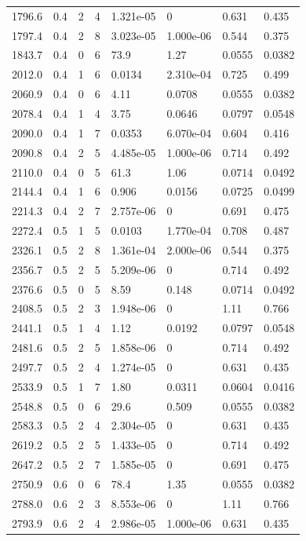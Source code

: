 \documentclass[preview]{standalone}
\begin{document}
{{{\begin{tabular}{L{1.2cm}C{1.2cm} C{0.3cm}C{0.5cm} C{1.4cm}C{1.4cm} C{1.4cm}C{1.4cm}}
  1796.6  &   0.4  & 2     &  4 &  1.321e-05  & 0  & 0.631 &  0.435   \\ 
  1797.4  &   0.4  & 2     &  8 &  3.023e-05  & 1.000e-06  & 0.544 &  0.375   \\ 
  1843.7  &   0.4  & 0     &  6 &  73.9  & 1.27  & 0.0555 &  0.0382   \\ 
  2012.0  &   0.4  & 1     &  6 &  0.0134  & 2.310e-04  & 0.725 &  0.499   \\ 
  2060.9  &   0.4  & 0     &  6 &  4.11  & 0.0708  & 0.0555 &  0.0382   \\ 
  2078.4  &   0.4  & 1     &  4 &  3.75  & 0.0646  & 0.0797 &  0.0548   \\ 
  2090.0  &   0.4  & 1     &  7 &  0.0353  & 6.070e-04  & 0.604 &  0.416   \\ 
  2090.8  &   0.4  & 2     &  5 &  4.485e-05  & 1.000e-06  & 0.714 &  0.492   \\ 
  2110.0  &   0.4  & 0     &  5 &  61.3  & 1.06  & 0.0714 &  0.0492   \\ 
  2144.4  &   0.4  & 1     &  6 &  0.906  & 0.0156  & 0.0725 &  0.0499   \\ 
  2214.3  &   0.4  & 2     &  7 &  2.757e-06  & 0  & 0.691 &  0.475   \\ 
  2272.4  &   0.5  & 1     &  5 &  0.0103  & 1.770e-04  & 0.708 &  0.487   \\ 
  2326.1  &   0.5  & 2     &  8 &  1.361e-04  & 2.000e-06  & 0.544 &  0.375   \\ 
  2356.7  &   0.5  & 2     &  5 &  5.209e-06  & 0  & 0.714 &  0.492   \\ 
  2376.6  &   0.5  & 0     &  5 &  8.59  & 0.148  & 0.0714 &  0.0492   \\ 
  2408.5  &   0.5  & 2     &  3 &  1.948e-06  & 0  & 1.11 &  0.766   \\ 
  2441.1  &   0.5  & 1     &  4 &  1.12  & 0.0192  & 0.0797 &  0.0548   \\ 
  2481.6  &   0.5  & 2     &  5 &  1.858e-06  & 0  & 0.714 &  0.492   \\ 
  2497.7  &   0.5  & 2     &  4 &  1.274e-05  & 0  & 0.631 &  0.435   \\ 
  2533.9  &   0.5  & 1     &  7 &  1.80  & 0.0311  & 0.0604 &  0.0416   \\ 
  2548.8  &   0.5  & 0     &  6 &  29.6  & 0.509  & 0.0555 &  0.0382   \\ 
  2583.3  &   0.5  & 2     &  4 &  2.304e-05  & 0  & 0.631 &  0.435   \\ 
  2619.2  &   0.5  & 2     &  5 &  1.433e-05  & 0  & 0.714 &  0.492   \\ 
  2647.2  &   0.5  & 2     &  7 &  1.585e-05  & 0  & 0.691 &  0.475   \\ 
  2750.9  &   0.6  & 0     &  6 &  78.4  & 1.35  & 0.0555 &  0.0382   \\ 
  2788.0  &   0.6  & 2     &  3 &  8.553e-06  & 0  & 1.11 &  0.766   \\ 
  2793.9  &   0.6  & 2     &  4 &  2.986e-05  & 1.000e-06  & 0.631 &  0.435   \\ 
\hline 
\end{tabular} 

}}}
\end{document}
